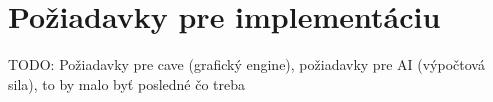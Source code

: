 \section{Požiadavky pre implementáciu}\label{sec:requirements}

TODO: Požiadavky pre cave (grafický engine), požiadavky pre AI (výpočtová sila),
to by malo byť posledné čo treba
